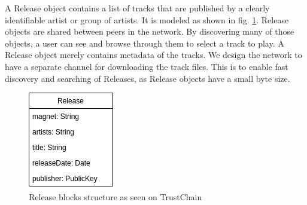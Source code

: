 A Release object contains a list of tracks that are published by a clearly identifiable artist or group of artists. It is modeled as shown in fig. \ref{fig:release-model}. Release objects are shared between peers in the network. By discovering many of those objects, a user can see and browse through them to select a track to play. A Release object merely contains metadata of the tracks. We design the network to have a separate channel for downloading the track files. This is to enable fast discovery and
searching of Releases, as Release objects have a small byte size. 
\begin{figure}
        \includegraphics[width=\linewidth]{design/release-model.png}
        \caption{Release blocks structure as seen on TrustChain}
        \label{fig:release-model}
    \endminipage\hfill

\end{figure}
